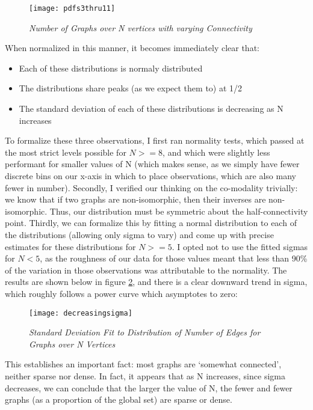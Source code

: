 \begin{figure}[h]
\label{fig:ngraphs}
\caption{\emph{Number of Graphs over N vertices with varying Connectivity}}
\centering
\texttt{[image: pdfs3thru11]}
\end{figure}

When normalized in this manner, it becomes immediately clear that:
\begin{itemize}
\item{Each of these distributions is normaly distributed}
\item{The distributions share peaks (as we expect them to) at 1/2}
\item{The standard deviation of each of these distributions is decreasing as N increases}
\end{itemize}

To formalize these three observations, I first ran normality tests, which passed at the most strict levels possible for $N>=8$, and which were slightly less performant for smaller values of N (which makes sense, as we simply have fewer discrete bins on our x-axis in which to place observations, which are also many fewer in number).
Secondly, I verified our thinking on the co-modality trivially: we know that if two graphs are non-isomorphic, then their inverses are non-isomorphic.
Thus, our distribution must be symmetric about the half-connectivity point.
Thirdly, we can formalize this by fitting a normal distribution to each of the distributions (allowing only sigma to vary) and come up with precise estimates for these distributions for $N>=5$.
I opted not to use the fitted sigmas for $N < 5$, as the roughness of our data for those values meant that less than 90\% of the variation in those observations was attributable to the normality.
The results are shown below in figure \ref{fig:decreasingsigma}, and there is a clear downward trend in sigma, which roughly follows a power curve which asymptotes to zero:

\begin{figure}[h]
\label{fig:decreasingsigma}
\caption{\emph{Standard Deviation Fit to Distribution of Number of Edges for Graphs over N Vertices}}
\centering
\texttt{[image: decreasingsigma]}
\end{figure}

This establishes an important fact: most graphs are `somewhat connected', neither sparse nor dense.
In fact, it appears that as N increases, since sigma decreases, we can conclude that the larger the value of N, the fewer and fewer graphs (as a proportion of the global set) are sparse or dense.

